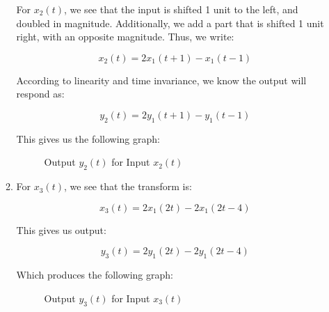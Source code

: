 \begin{enumerate}
\begin{enumerate}
        For $x_2(t)$, we see that the input is shifted 1 unit to the left, and doubled in magnitude. Additionally, we add a part that is shifted 1 unit right, with an opposite magnitude. Thus, we write:

        $$x_2(t)=2x_1(t+1)-x_1(t-1)$$

        According to linearity and time invariance, we know the output will respond as:

        $$\boxed{y_2(t)=2y_1(t+1)-y_1(t-1)}$$

        This gives us the following graph:

        \begin{figure}[H]
          \centering
          
          \caption{Output $y_2(t)$ for Input $x_2(t)$}
          \label{fig:7}
        \end{figure}

      \item 

        For $x_3(t)$, we see that the transform is:

        $$x_3(t)=2x_1\left( 2t \right)-2x_1(2t-4)$$

        This gives us output:

        $$\boxed{y_3(t)=2y_1\left( 2t \right)-2y_1(2t-4)}$$

        Which produces the following graph:

        \begin{figure}[H]
          \centering
          
          \caption{Output $y_3(t)$ for Input $x_3(t)$}
          \label{fig:8}
        \end{figure}

    \end{enumerate}

\end{enumerate}



